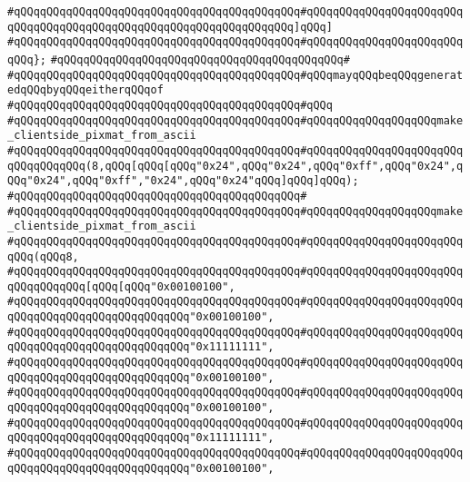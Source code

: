 \verb|#qQQqqQQqqQQqqQQqqQQqqQQqqQQqqQQqqQQqqQQqqQQq#qQQqqQQqqQQqqQQqqQQqqQQqqQQqqQQqqQQqqQQqqQQqqQQqqQQqqQQqqQQqqQQqqQQq]qQQq]|\newline
\verb|#qQQqqQQqqQQqqQQqqQQqqQQqqQQqqQQqqQQqqQQqqQQq#qQQqqQQqqQQqqQQqqQQqqQQqqQQq};|\newline
\verb|#qQQqqQQqqQQqqQQqqQQqqQQqqQQqqQQqqQQqqQQqqQQq#|\newline
\verb|#qQQqqQQqqQQqqQQqqQQqqQQqqQQqqQQqqQQqqQQqqQQq#qQQqmayqQQqbeqQQqgeneratedqQQqbyqQQqeitherqQQqof|\newline
\verb|#qQQqqQQqqQQqqQQqqQQqqQQqqQQqqQQqqQQqqQQqqQQq#qQQq|\newline
\verb|#qQQqqQQqqQQqqQQqqQQqqQQqqQQqqQQqqQQqqQQqqQQq#qQQqqQQqqQQqqQQqqQQqmake_clientside_pixmat_from_ascii|\newline
\verb|#qQQqqQQqqQQqqQQqqQQqqQQqqQQqqQQqqQQqqQQqqQQq#qQQqqQQqqQQqqQQqqQQqqQQqqQQqqQQqqQQq(8,qQQq[qQQq[qQQq"0x24",qQQq"0x24",qQQq"0xff",qQQq"0x24",qQQq"0x24",qQQq"0xff","0x24",qQQq"0x24"qQQq]qQQq]qQQq);|\newline
\verb|#qQQqqQQqqQQqqQQqqQQqqQQqqQQqqQQqqQQqqQQqqQQq#|\newline
\verb|#qQQqqQQqqQQqqQQqqQQqqQQqqQQqqQQqqQQqqQQqqQQq#qQQqqQQqqQQqqQQqqQQqmake_clientside_pixmat_from_ascii|\newline
\verb|#qQQqqQQqqQQqqQQqqQQqqQQqqQQqqQQqqQQqqQQqqQQq#qQQqqQQqqQQqqQQqqQQqqQQqqQQq(qQQq8,|\newline
\verb|#qQQqqQQqqQQqqQQqqQQqqQQqqQQqqQQqqQQqqQQqqQQq#qQQqqQQqqQQqqQQqqQQqqQQqqQQqqQQqqQQq[qQQq[qQQq"0x00100100",|\newline
\verb|#qQQqqQQqqQQqqQQqqQQqqQQqqQQqqQQqqQQqqQQqqQQq#qQQqqQQqqQQqqQQqqQQqqQQqqQQqqQQqqQQqqQQqqQQqqQQqqQQq"0x00100100",|\newline
\verb|#qQQqqQQqqQQqqQQqqQQqqQQqqQQqqQQqqQQqqQQqqQQq#qQQqqQQqqQQqqQQqqQQqqQQqqQQqqQQqqQQqqQQqqQQqqQQqqQQq"0x11111111",|\newline
\verb|#qQQqqQQqqQQqqQQqqQQqqQQqqQQqqQQqqQQqqQQqqQQq#qQQqqQQqqQQqqQQqqQQqqQQqqQQqqQQqqQQqqQQqqQQqqQQqqQQq"0x00100100",|\newline
\verb|#qQQqqQQqqQQqqQQqqQQqqQQqqQQqqQQqqQQqqQQqqQQq#qQQqqQQqqQQqqQQqqQQqqQQqqQQqqQQqqQQqqQQqqQQqqQQqqQQq"0x00100100",|\newline
\verb|#qQQqqQQqqQQqqQQqqQQqqQQqqQQqqQQqqQQqqQQqqQQq#qQQqqQQqqQQqqQQqqQQqqQQqqQQqqQQqqQQqqQQqqQQqqQQqqQQq"0x11111111",|\newline
\verb|#qQQqqQQqqQQqqQQqqQQqqQQqqQQqqQQqqQQqqQQqqQQq#qQQqqQQqqQQqqQQqqQQqqQQqqQQqqQQqqQQqqQQqqQQqqQQqqQQq"0x00100100",|\newline
